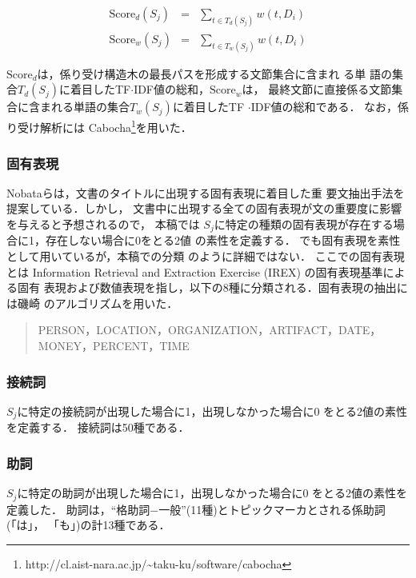 \begin{eqnarray}
 \mbox{Score}_{d}(S_j) &=& \sum_{t \in T_d(S_j)} w(t,D_i)\nonumber\\
 \mbox{Score}_{w}(S_j) &=& \sum_{t \in T_w(S_j)} w(t,D_i)\nonumber
\end{eqnarray}

$\mbox{Score}_{d}$は，係り受け構造木の最長パスを形成する文節集合に含まれ
る単
語の集合$T_{d}(S_j)$に着目したTF$\cdot$IDF値の総和，$\mbox{Score}_{w}$は，
最終文節に直接係る文節集合に含まれる単語の集合$T_{w}(S_j)$に着目したTF
$\cdot$IDF値の総和である．
なお，係り受け解析には
Cabocha\footnote{
http://cl.aist-nara.ac.jp/\~{}taku-ku/software/cabocha
}を用いた．

\subsubsection*{固有表現}

Nobataら\cite{article5}は，文書のタイトルに出現する固有表現に着目した重
要文抽出手法を提案している．しかし，
文書中に出現する全ての固有表現が文の重要度に影響を与えると予想されるので，
本稿では
$S_j$に特定の種類の固有表現が存在する場合に1，存在しない場合に0をとる2値
の素性を定義する．
\cite{article1}でも固有表現を素性として用いているが，本稿での分類
のように詳細ではない．
ここでの固有表現とは Information Retrieval and Extraction Exercise
(IREX) \cite{article35} の固有表現基準による固有
表現および数値表現を指し，以下の8種に分類される．固有表現の抽出には磯崎
のアルゴリズム\cite{article7}を用いた．

\begin{quote}
 PERSON，LOCATION，ORGANIZATION，ARTIFACT，DATE，MONEY，PERCENT，TIME
\end{quote}

\subsubsection*{接続詞\cite{article3}}

$S_j$に特定の接続詞が出現した場合に1，出現しなかった場合に0
をとる2値の素性を定義する．
接続詞は50種である．

\subsubsection*{助詞\cite{article3}}

$S_j$に特定の助詞が出現した場合に1，出現しなかった場合に0
をとる2値の素性を定義した．
助詞は，``格助詞$-$一般''(11種)とトピックマーカとされる係助詞(「は」，
「も」)の計13種である．

